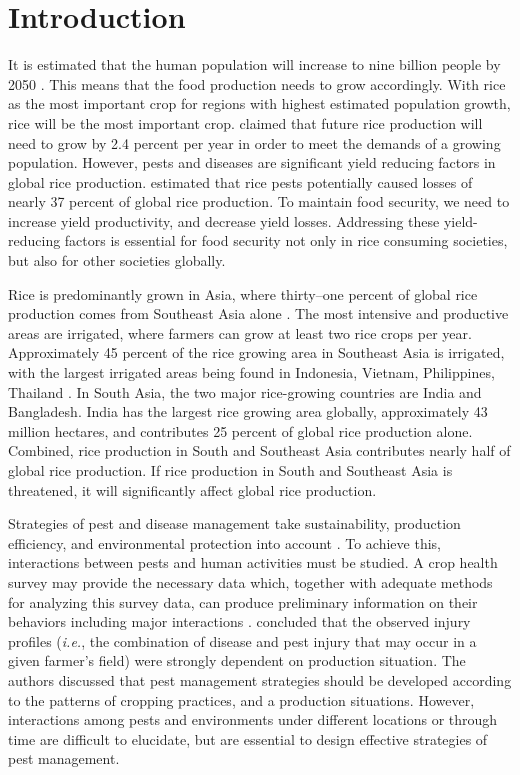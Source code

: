 \section*{Introduction}

It is estimated that the human population will increase to nine billion people by 2050 \citep{Worldbank_2008}. This means that the food production needs to grow accordingly. With rice as the most important crop for regions with highest estimated population growth, rice will be the most important crop. \citet{Ray_2013_Yield} claimed that future rice production will need to grow by 2.4 percent per year in order to meet the demands of a growing population. However, pests and diseases are significant yield reducing factors in global rice production. \citet{Oerke_2005_Crop} estimated that rice pests potentially caused losses of nearly 37 percent of global rice production. To maintain food security, we need to increase yield productivity, and decrease yield losses. Addressing these yield-reducing factors is essential for food security not only in rice consuming societies, but also for other societies globally. 


Rice is predominantly grown in Asia, where thirty–one percent of global rice production comes from Southeast Asia alone \citep{OECD_2012_Agricultural}. The most intensive and productive areas are irrigated, where farmers can grow at least two rice crops per year. Approximately 45 percent of the rice growing area in Southeast Asia is irrigated, with the largest irrigated areas being found in Indonesia, Vietnam, Philippines, Thailand \citep{Mutert_2002_Developments}. In South Asia, the two major rice-growing countries are India and Bangladesh. India has the largest rice growing area globally, approximately 43 million hectares, and contributes 25 percent of global rice production alone. Combined, rice production in South and Southeast Asia contributes nearly half of global rice production. If rice production in South and Southeast Asia is threatened, it will significantly affect global rice production. 

Strategies of pest and disease management take sustainability, production efficiency, and environmental protection into account \citep{Mew_2004_Looking}. To achieve this, interactions between pests and human activities must be studied. A crop health survey may provide the necessary data which, together with adequate methods for analyzing this survey data, can produce preliminary information on their behaviors including major interactions \citep{Savary_1995_Use}. \citet{Savary_2000_Characterization} concluded that the observed injury profiles (\textit{i.e.}, the combination of disease and pest injury that may occur in a given farmer’s field) were strongly dependent on production situation. The authors discussed that pest management strategies should be developed according to the patterns of cropping practices, and a production situations. However, interactions among pests and environments under different locations or through time are difficult to elucidate, but are essential to design effective  strategies of pest management. 

